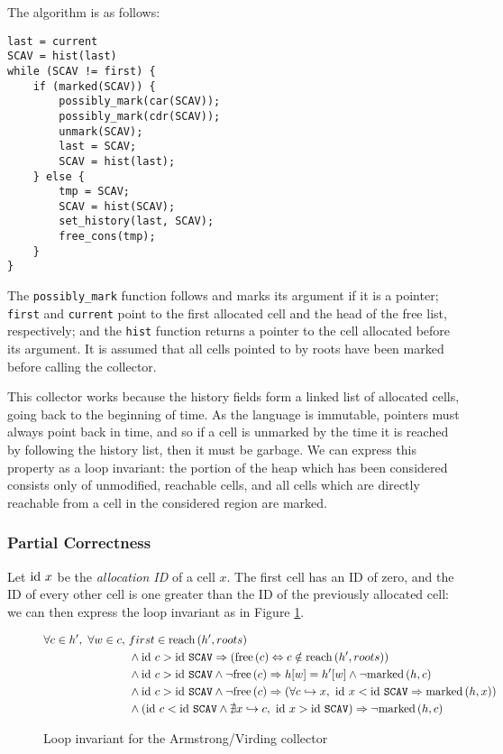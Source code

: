 The algorithm is as follows:

\begin{lstlisting}
last = current
SCAV = hist(last)
while (SCAV != first) {
    if (marked(SCAV)) {
        possibly_mark(car(SCAV));
        possibly_mark(cdr(SCAV));
        unmark(SCAV);
        last = SCAV;
        SCAV = hist(last);
    } else {
        tmp = SCAV;
        SCAV = hist(SCAV);
        set_history(last, SCAV);
        free_cons(tmp);
    }
}
\end{lstlisting}

The \texttt{possibly\_mark} function follows and marks its argument if
it is a pointer; \texttt{first} and \texttt{current} point to the
first allocated cell and the head of the free list, respectively; and
the \texttt{hist} function returns a pointer to the cell allocated
before its argument. It is assumed that all cells pointed to by roots
have been marked before calling the collector.

This collector works because the history fields form a linked list of
allocated cells, going back to the beginning of time. As the language
is immutable, pointers must always point back in time, and so if a
cell is unmarked by the time it is reached by following the history
list, then it must be garbage. We can express this property as a loop
invariant: the portion of the heap which has been considered consists
only of unmodified, reachable cells, and all cells which are directly
reachable from a cell in the considered region are marked.

\subsubsection{Partial Correctness}
\label{sec:marksweep-example-partial}

Let $\mathrm{id}~x$ be the \textit{allocation ID} of a cell $x$. The first
cell has an ID of zero, and the ID of every other cell is one greater
than the ID of the previously allocated cell: we can then express the
loop invariant as in Figure
\ref{fig:marksweep-example-partial-invariant}.

\begin{figure}[t]
  \centering
  \begin{align*}
    \forall c \in h',\ \forall w \in c,\ &first \in \reach{h'}{roots}\\
%
    &\land \id~c > \id~\mathtt{SCAV} \implies (\free{c}
      \iff c \notin \reach{h'}{roots})\\
%
    &\land \id~c > \id~\mathtt{SCAV} \land \lnot\free{c}
      \implies h[w] = h'[w] \land \lnot \marked{h}{c}\\
%
    &\land \id~c > \id~\mathtt{SCAV} \land \lnot\free{c}
      \implies (\forall c \pointsto x,\ \id~x < \id~\mathtt{SCAV}
      \implies \marked{h}{x})\\
%
    &\land \left(\id~c < \id~\mathtt{SCAV} \land \nexists x \pointsto
      c,\ \id~x > \id~\mathtt{SCAV}\right) \implies \lnot\marked{h}{c}
  \end{align*}  
  \caption{Loop invariant for the Armstrong/Virding collector}
  \label{fig:marksweep-example-partial-invariant}
\end{figure}

